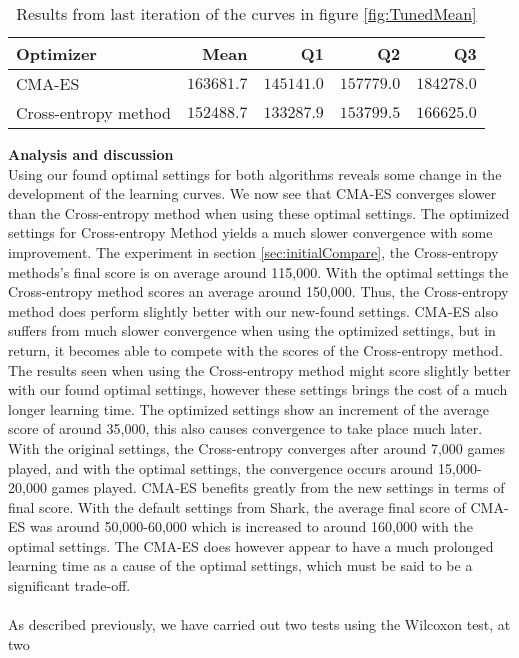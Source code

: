 \begin{table}[H]
\centering
\small
\begin{tabular}{l r r r r}
Optimizer & Mean & Q1 & Q2 & Q3\\
\hline
CMA-ES  & $163681.7$ & $145141.0$ & $157779.0$ & $184278.0$\\
Cross-entropy method & $152488.7$ & $133287.9$ & $153799.5$ & $166625.0$\\
\end{tabular}
\caption{Results from last iteration of the curves in figure \ref{fig:TunedMean}
\label{table:tunedResultTable}}
\end{table}
\vspace{0.5cm}
\textbf{Analysis and discussion}\\
Using our found optimal settings for both algorithms reveals some change in the 
development of the learning curves. We now see that CMA-ES converges slower than
the Cross-entropy method when using these optimal settings. 
The optimized settings for Cross-entropy Method yields a much slower convergence
with some improvement. The experiment in section \ref{sec:initialCompare}, the Cross-entropy
methods's final score is on average around 115,000. With the optimal settings
the Cross-entropy method scores an average around 150,000. Thus, the Cross-entropy 
method does perform slightly better with our new-found settings.
CMA-ES also suffers from much slower convergence 
when using the optimized settings, but in return, it becomes able to compete with
the scores of the Cross-entropy method. The results seen when using the Cross-entropy
method  might
score slightly better with our found optimal settings, however these settings
brings the cost of a much longer learning time. The optimized settings show
an increment of the average score of around 35,000, this also causes convergence to
take place much later. With the original settings, the Cross-entropy converges 
after around 7,000 games played, and with the optimal settings, the convergence 
occurs around 15,000-20,000 games played.
CMA-ES benefits greatly from the new settings in terms of final score.
With the default settings from Shark, the average final score of CMA-ES was around
50,000-60,000 which is increased to around 160,000 with the optimal settings.
The CMA-ES does however appear to have a much prolonged learning time
as a cause of the optimal settings, which must be said to be a significant trade-off.\\
\\
As described previously, we have carried out two tests using the Wilcoxon test, at two 
